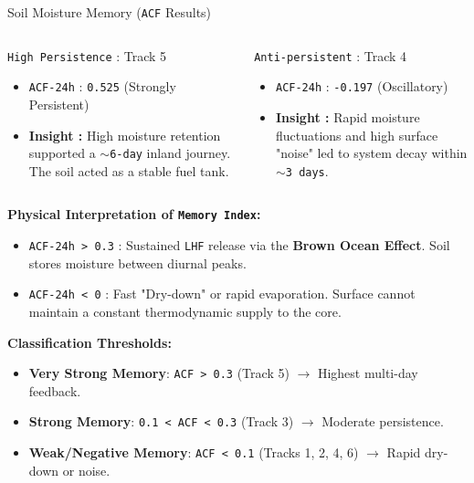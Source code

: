 \documentclass[8pt, aspectratio=169]{beamer}
\begin{document}
\begin{frame}{Soil Moisture Memory (\texttt{ACF} Results)}
    \vspace{0.1cm}
    \begin{columns}[T]
        \begin{block}{\footnotesize \texttt{High Persistence} : Track 5}
            \footnotesize
            \begin{itemize}
                \item \texttt{ACF-24h} : \texttt{0.525} (Strongly Persistent)
                \item \textbf{Insight :} High moisture retention supported a \texttt{$\sim$6-day} inland journey. The soil acted as a stable fuel tank.
            \end{itemize}
        \end{block}

        \begin{block}{\footnotesize \texttt{Anti-persistent} : Track 4}
            \footnotesize
            \begin{itemize}
                \item \texttt{ACF-24h} : \texttt{-0.197} (Oscillatory)
                \item \textbf{Insight :} Rapid moisture fluctuations and high surface "noise" led to system decay within \texttt{$\sim$3 days}.
            \end{itemize}
        \end{block}
    \end{columns}

    \vspace{0.2cm}
    \footnotesize
    \textbf{Physical Interpretation of \texttt{Memory Index}:}
    \begin{itemize}
        \item \texttt{ACF-24h > 0.3} : Sustained \texttt{LHF} release via the \textbf{Brown Ocean Effect}. Soil stores moisture between diurnal peaks.
        \item \texttt{ACF-24h < 0} : Fast "Dry-down" or rapid evaporation. Surface cannot maintain a constant thermodynamic supply to the core.
    \end{itemize}

    \vspace{0.2cm}
    \footnotesize
    \textbf{Classification Thresholds:}
    \begin{itemize}
        \item \textbf{Very Strong Memory}: \texttt{ACF > 0.3} (Track 5) $\rightarrow$ Highest multi-day feedback.
        \item \textbf{Strong Memory}: \texttt{0.1 < ACF < 0.3} (Track 3) $\rightarrow$ Moderate persistence.
        \item \textbf{Weak/Negative Memory}: \texttt{ACF < 0.1} (Tracks 1, 2, 4, 6) $\rightarrow$ Rapid dry-down or noise.
    \end{itemize}
\end{frame}
\end{document}
